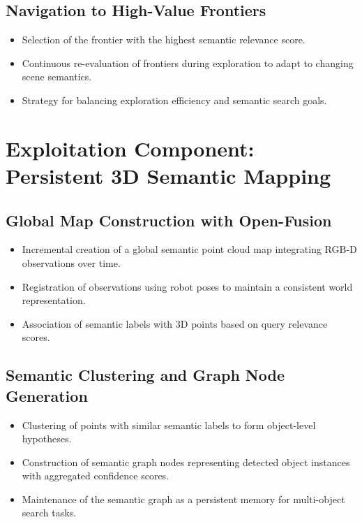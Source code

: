 \subsection{Navigation to High-Value Frontiers}
\begin{itemize}
    \item Selection of the frontier with the highest semantic relevance score.
    \item Continuous re-evaluation of frontiers during exploration to adapt to changing scene semantics.
    \item Strategy for balancing exploration efficiency and semantic search goals.
\end{itemize}

\section{Exploitation Component: Persistent 3D Semantic Mapping}

\subsection{Global Map Construction with Open-Fusion}
\begin{itemize}
    \item Incremental creation of a global semantic point cloud map integrating RGB-D observations over time.
    \item Registration of observations using robot poses to maintain a consistent world representation.
    \item Association of semantic labels with 3D points based on query relevance scores.
\end{itemize}

\subsection{Semantic Clustering and Graph Node Generation}
\begin{itemize}
    \item Clustering of points with similar semantic labels to form object-level hypotheses.
    \item Construction of semantic graph nodes representing detected object instances with aggregated confidence scores.
    \item Maintenance of the semantic graph as a persistent memory for multi-object search tasks.
\end{itemize}

